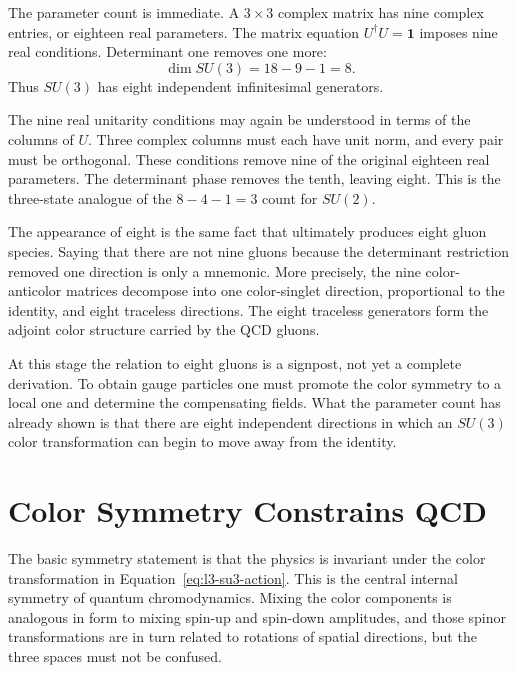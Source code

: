 The parameter count is immediate. A \(3\times3\) complex matrix has nine
complex entries, or eighteen real parameters. The matrix equation
\(U^\dagger U=\boldsymbol 1\) imposes nine real conditions. Determinant one
removes one more:
\begin{equation}
\dim SU(3)=18-9-1=8.
\end{equation}
Thus \(SU(3)\) has eight independent infinitesimal generators.

The nine real unitarity conditions may again be understood in terms of the
columns of \(U\). Three complex columns must each have unit norm, and every
pair must be orthogonal. These conditions remove nine of the original eighteen
real parameters. The determinant phase removes the tenth, leaving eight.
This is the three-state analogue of the \(8-4-1=3\) count for \(SU(2)\).

The appearance of eight is the same fact that ultimately produces eight gluon
species. Saying that there are not nine gluons because the determinant
restriction removed one direction is only a mnemonic. More precisely, the
nine color-anticolor matrices decompose into one color-singlet direction,
proportional to the identity, and eight traceless directions. The eight
traceless generators form the adjoint color structure carried by the QCD
gluons.

At this stage the relation to eight gluons is a signpost, not yet a complete
derivation. To obtain gauge particles one must promote the color symmetry to a
local one and determine the compensating fields. What the parameter count has
already shown is that there are eight independent directions in which an
\(SU(3)\) color transformation can begin to move away from the identity.

\section{Color Symmetry Constrains QCD}

The basic symmetry statement is that the physics is invariant under the color
transformation in Equation~\eqref{eq:l3-su3-action}. This is the central
internal symmetry of quantum chromodynamics. Mixing the color components is
analogous in form to mixing spin-up and spin-down amplitudes, and those spinor
transformations are in turn related to rotations of spatial directions, but
the three spaces must not be confused.

